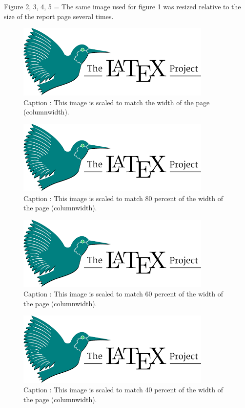 \documentclass[a4paper, 11pt]{report}
\begin{document}
Figure 2, 3, 4, 5 = The same image used for figure 1 was resized relative to the size of the report page several times.
\begin{figure}[hp]
\centering
\includegraphics[width=1\columnwidth]{latexLogo.png}
\caption{Caption : This image is scaled to match the width of the page (columnwidth).}
\label{fig}
\end{figure}
\begin{figure}[hp]
\centering
\includegraphics[width=0.8\columnwidth]{latexLogo.png}
\caption{Caption : This image is scaled to match 80 percent of the width of the page (columnwidth).}
\label{fig}
\end{figure}
\begin{figure}[hp]
\centering
\includegraphics[width=0.6\columnwidth]{latexLogo.png}
\caption{Caption : This image is scaled to match 60 percent of the width of the page (columnwidth).}
\label{fig}
\end{figure}
\begin{figure}[hp]
\centering
\includegraphics[width=0.4\columnwidth]{latexLogo.png}
\caption{Caption : This image is scaled to match 40 percent of the width of the page (columnwidth).}
\label{fig}
\end{figure}
\end{document}
